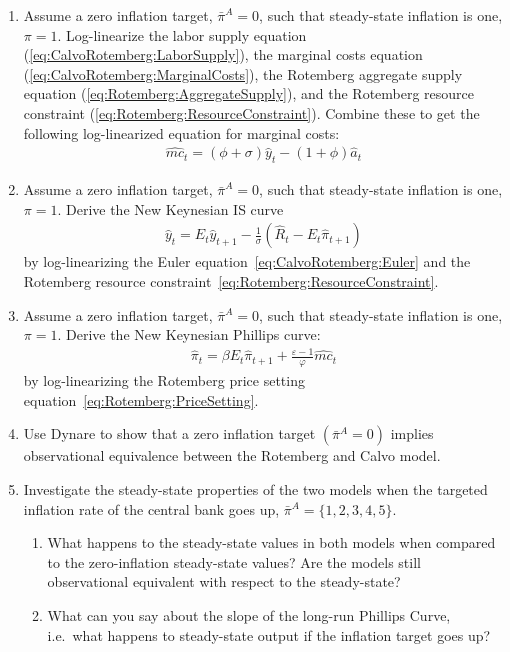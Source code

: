 \documentclass{article}
\numberwithin{equation}{section}
\begin{document}
\begin{enumerate}

\item Assume a zero inflation target, \(\bar{\pi}^{A}=0\), such that steady-state inflation is one, \(\pi = 1\).
Log-linearize the labor supply equation (\ref{eq:CalvoRotemberg:LaborSupply}),
  the marginal costs equation (\ref{eq:CalvoRotemberg:MarginalCosts}),
  the Rotemberg aggregate supply equation (\ref{eq:Rotemberg:AggregateSupply}),
  and the Rotemberg resource constraint (\ref{eq:Rotemberg:ResourceConstraint}).
Combine these to get the following log-linearized equation for marginal costs:
\begin{align}
\hat{mc}_t = (\phi+\sigma) \hat{y}_t - (1+\phi) \hat{a}_t \label{eq:LogLinearization.MarginalCosts}
\end{align}

\item Assume a zero inflation target, \(\bar{\pi}^{A}=0\), such that steady-state inflation is one, \(\pi = 1\).
Derive the New Keynesian IS curve
\begin{align*}
\hat{y}_t = E_{t} \hat{y}_{t+1} - \frac{1}{\sigma} \left( \hat{R}_t - E_{t} \hat{\pi}_{t+1} \right)
\end{align*}
by log-linearizing the Euler equation~\eqref{eq:CalvoRotemberg:Euler}
and the Rotemberg resource constraint~\eqref{eq:Rotemberg:ResourceConstraint}.

\item Assume a zero inflation target, \(\bar{\pi}^{A}=0\), such that steady-state inflation is one, \(\pi = 1\).
Derive the New Keynesian Phillips curve:
\begin{align*}
\hat{\pi}_t = \beta E_{t} \hat{\pi}_{t+1} + \frac{\varepsilon-1}{\varphi} \hat{mc}_t
\end{align*}
by log-linearizing the Rotemberg price setting equation~\eqref{eq:Rotemberg:PriceSetting}.

\item Use Dynare to show that a zero inflation target \((\bar{\pi}^{A}=0)\) implies observational equivalence between the Rotemberg and Calvo model.

\item Investigate the steady-state properties of the two models when the targeted inflation rate of the central bank goes up, \(\bar{\pi}^{A} = \{1, 2, 3, 4, 5\} \).

\begin{enumerate}
  \item What happens to the steady-state values in both models when compared to the zero-inflation steady-state values?
  Are the models still observational equivalent with respect to the steady-state?
  \item What can you say about the slope of the long-run Phillips Curve, i.e.\ what happens to steady-state output if the inflation target goes up?
\end{enumerate}


\end{enumerate}
\end{document}
